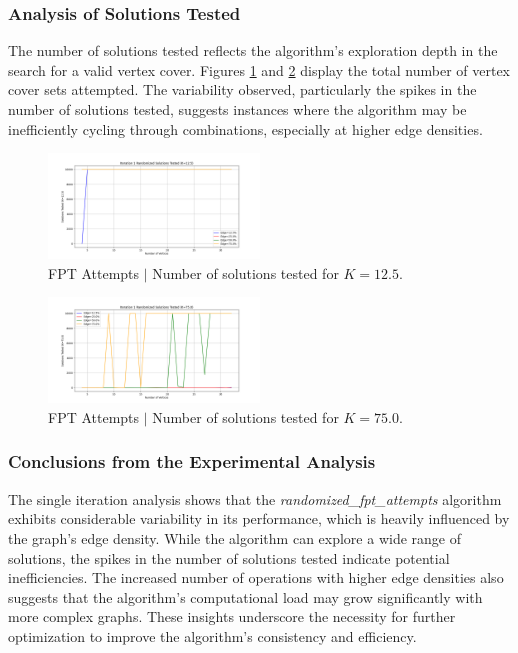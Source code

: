 \subsubsection{Analysis of Solutions Tested}
The number of solutions tested reflects the algorithm's exploration depth in the search for a valid vertex cover. Figures \ref{fig:atmpts_sol_tested_k12_5} and \ref{fig:atmpts_sol_tested_k75} display the total number of vertex cover sets attempted. The variability observed, particularly the spikes in the number of solutions tested, suggests instances where the algorithm may be inefficiently cycling through combinations, especially at higher edge densities.

\begin{figure}[h]
\centering
\includegraphics[width=0.5\textwidth]{FPT_attempts/Solutions Tested (K=12.5).png}
\caption{FPT Attempts \(|\) Number of solutions tested for \( K=12.5 \).}
\label{fig:atmpts_sol_tested_k12_5}
\end{figure}

\begin{figure}[h]
\centering
\includegraphics[width=0.5\textwidth]{FPT_attempts/Solutions Tested (K=75.0).png}
\caption{FPT Attempts \(|\) Number of solutions tested for \( K=75.0 \).}
\label{fig:atmpts_sol_tested_k75}
\end{figure}

\subsubsection{Conclusions from the Experimental Analysis}
The single iteration analysis shows that the \textit{randomized\_fpt\_attempts} algorithm exhibits considerable variability in its performance, which is heavily influenced by the graph's edge density. While the algorithm can explore a wide range of solutions, the spikes in the number of solutions tested indicate potential inefficiencies. The increased number of operations with higher edge densities also suggests that the algorithm's computational load may grow significantly with more complex graphs. These insights underscore the necessity for further optimization to improve the algorithm's consistency and efficiency.


